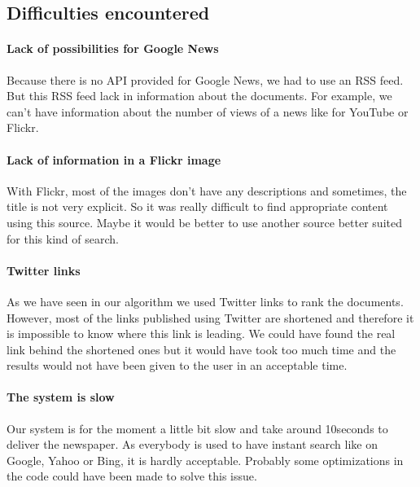 \documentclass{acmsmall}
\begin{document}
\subsection{Difficulties encountered}

\paragraph{Lack of possibilities for Google News}Because there is no API provided for Google News, we had to use an RSS feed. But this RSS feed lack in information about the documents. For example, we can't have information about the number of views of a news like for YouTube or Flickr.

\paragraph{Lack of information in a Flickr image}With Flickr, most of the images don't have any descriptions and sometimes, the title is not very explicit. So it was really difficult to find appropriate content using this source. Maybe it would be better to use another source better suited for this kind of search. 

\paragraph{Twitter links}As we have seen in our algorithm we used Twitter links to rank the documents. However, most of the links published using Twitter are shortened and therefore it is impossible to know where this link is leading. We could have found the real link behind the shortened ones but it would have took too much time and the results would not have been given to the user in an acceptable time.

\paragraph{The system is slow}Our system is for the moment a little bit slow and take around 10seconds to deliver the newspaper. As everybody is used to have instant search like on Google, Yahoo or Bing, it is hardly acceptable. Probably some optimizations in the code could have been made to solve this issue.


%
%
\end{document}
